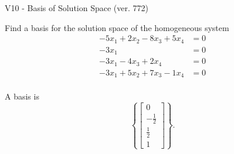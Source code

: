\begin{exercise}
  \begin{exerciseTitle}V10 - Basis of Solution Space (ver. 772)\end{exerciseTitle}
  \begin{exerciseStatement}
    Find a basis for the solution space of the homogeneous system 
\begin{align*}
 -5 x_ 1 + 2 x_ 2 -8 x_ 3 + 5 x_ 4 &= 0  \\ 
  -3 x_ 1 &= 0  \\ 
  -3 x_ 1 -4 x_ 3 + 2 x_ 4 &= 0  \\ 
  -3 x_ 1 + 5 x_ 2 + 7 x_ 3 -1 x_ 4 &= 0  \\ 
 \end{align*}


 
  \end{exerciseStatement}

  \begin{exerciseAnswer}
   A basis is   
\[\left\{\left[\begin{array}{c}
0 \\
-\frac{1}{2} \\
\frac{1}{2} \\
1
\end{array}\right]\right\}.\]

  


  \end{exerciseAnswer}
\end{exercise}